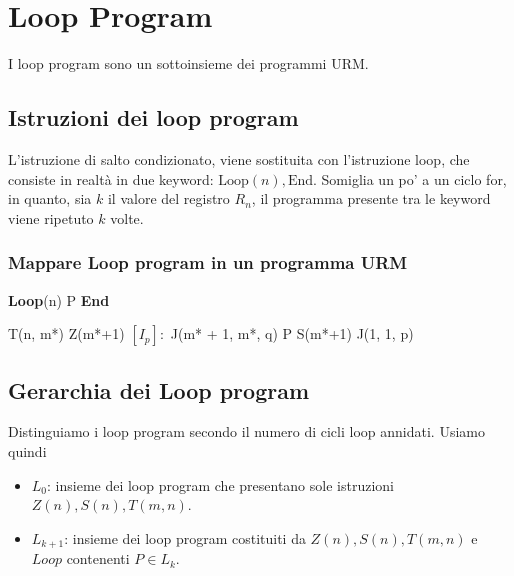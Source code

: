 \chapter{Loop Program}
	
	I loop program sono un sottoinsieme dei programmi URM.
	
	\section{Istruzioni dei loop program}
	L'istruzione di salto condizionato, viene sostituita con l'istruzione loop, che consiste in realtà in due keyword: $\mathrm{Loop}(n) , \mathrm{End}$. Somiglia un po' a un ciclo for, in quanto, sia $k$ il valore del registro $R_n$, il programma presente tra le keyword viene ripetuto $k$ volte.
	
	\subsection{Mappare Loop program in un programma URM}
	
	\begin{algorithm}
		\caption{\textit{Loop program}}
		\begin{algorithmic}
		\State \textbf{Loop}(n)
		\State \quad P
		\State \textbf{End}
		\end{algorithmic}
	\end{algorithm}
	
	
	\begin{algorithm}
		\caption{\textit{Loop program in URM}}
		\begin{algorithmic}
			\State T(n, m*)
			\State Z(m*+1)
			\State $[I_p]:$
			\State J(m* + 1, m*, q)
			\State P
			\State S(m*+1)
			\State J(1, 1, p)
		\end{algorithmic}
	\end{algorithm}
	
	\section{Gerarchia dei Loop program}
	Distinguiamo i loop program secondo il numero di cicli loop annidati. Usiamo quindi
	\begin{itemize}
		\item $L_0$: insieme dei loop program che presentano sole istruzioni $Z(n), S(n), T(m,n)$.
		\item $L_{k+1}$: insieme dei loop program costituiti da $Z(n), S(n), T(m,n)$ e $Loop$ contenenti $P \in L_k$.
	\end{itemize}
	
